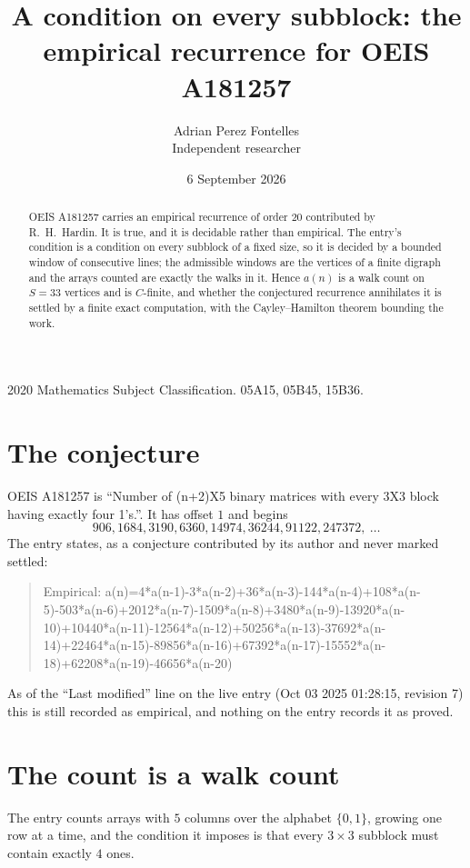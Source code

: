 \documentclass[11pt,a4paper]{article}
\title{A condition on every subblock: the empirical recurrence for OEIS A181257}
\author{Adrian Perez Fontelles\\ \small Independent researcher}
\date{6 September 2026}
\theoremstyle{plain}
\theoremstyle{definition}
\begin{document}
\maketitle

\begin{abstract}
OEIS A181257 carries an empirical recurrence of order $20$ contributed by R.~H.~Hardin. It is
true, and it is decidable rather than empirical. The entry's condition is a condition on every
subblock of a fixed size, so it is decided by a bounded window of consecutive lines; the
admissible windows are the vertices of a finite digraph and the arrays counted are exactly the
walks in it. Hence $a(n)$ is a walk count on $S=33$ vertices and is $C$-finite, and whether the
conjectured recurrence annihilates it is settled by a finite exact computation, with the
Cayley--Hamilton theorem bounding the work.
\end{abstract}

\noindent\small 2020 Mathematics Subject Classification. 05A15, 05B45, 15B36.\normalsize

\section{The conjecture}

OEIS A181257 is ``Number of (n+2)X5 binary matrices with every 3X3 block having exactly four 1's.''. It has offset $1$ and begins
\[
906, 1684, 3190, 6360, 14974, 36244, 91122, 247372,\ \dots
\]
The entry states, as a conjecture contributed by its author and never marked settled:
\begin{quote}
Empirical: a(n)=4*a(n-1)-3*a(n-2)+36*a(n-3)-144*a(n-4)+108*a(n-5)-503*a(n-6)+2012*a(n-7)-1509*a(n-8)+3480*a(n-9)-13920*a(n-10)+10440*a(n-11)-12564*a(n-12)+50256*a(n-13)-37692*a(n-14)+22464*a(n-15)-89856*a(n-16)+67392*a(n-17)-15552*a(n-18)+62208*a(n-19)-46656*a(n-20)
\end{quote}
As of the ``Last modified'' line on the live entry (Oct 03 2025 01:28:15, revision 7) this is still
recorded as empirical, and nothing on the entry records it as proved.

\section{The count is a walk count}

The entry counts arrays with $5$ columns over the alphabet $\{0,1\}$, growing one row at a time, and the condition it imposes is that every $3\times3$ subblock must contain exactly $4$ ones.
\end{document}
